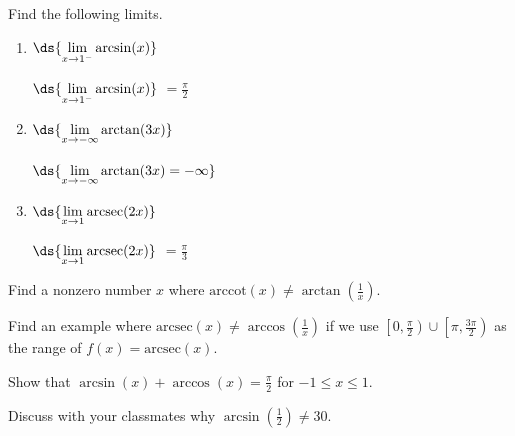 \documentclass{ximera}
\begin{document}
\begin{problem}
Find the following limits.

\begin{enumerate}

\item $\ds{ \lim_{x \rightarrow 1^{-}} \arcsin(x)}$

\begin{solution}
$\ds{ \lim_{x \rightarrow 1^{-}} \arcsin(x)}$ $=\frac{\pi}{2}$
\end{solution}

\item  $\ds{\lim_{x \rightarrow -\infty} \arctan(3x)}$

\begin{solution}
$\ds{\lim_{x \rightarrow -\infty} \arctan(3x) = -\infty}$
\end{solution}

\item  $\ds{\lim_{x \rightarrow 1} \text{arcsec}(2x)}$

\begin{solution}
$\ds{\lim_{x \rightarrow 1} \text{arcsec}(2x)}$ $= \frac{\pi}{3}$
\end{solution}

\end{enumerate}

\end{problem}

\begin{problem}
Find a nonzero number $x$ where $\mbox{arccot}(x) \neq \arctan \left( \frac{1}{x} \right)$.
\end{problem}

\begin{problem}
Find an example where $\mbox{arcsec}(x) \neq \arccos \left( \frac{1}{x} \right)$ if we use $\left[0, \frac{\pi}{2} \right) \cup \left[ \pi,  \frac{3\pi}{2} \right)$ as the range of $f(x) = \mbox{arcsec}(x)$.
\end{problem}

\begin{problem}
Show that $\arcsin(x) + \arccos(x) = \frac{\pi}{2}$ for $-1 \leq x \leq 1$.
\end{problem}

\begin{problem}
Discuss with your classmates why $\arcsin\left(\frac{1}{2}\right) \neq 30$.
\end{problem}
\end{document}
